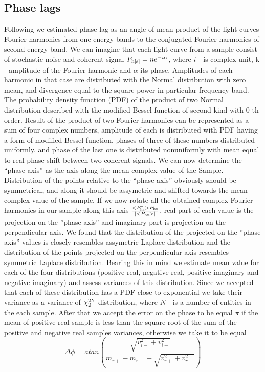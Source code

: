 \documentclass[a4paper,fleqn,usenatbib]{mnras}
\begin{document}
\subsection{Phase lags}
    
Following \citep{1997ApJ...474L..43V} we estimated phase lag as an angle of mean product of the light curves Fourier harmonics from one energy bands to the conjugated Fourier harmonics of second energy band. 
We can imagine that each light curve from a sample consist of stochastic noise and coherent signal $F_{\rm h[s]} = ne^{-i\alpha}$, where $i$ - is complex unit, k - amplitude of the Fourier harmonic and $\alpha$ its phase.
Amplitudes of each harmonic in that case are distributed with the Normal distribution with zero mean, and divergence equal to the square power in particular frequency band. 
The probability density function (PDF) of the product of two Normal distribution described with the modified Bessel function of second kind with 0-th order. 
Result of the product of two Fourier harmonics can be represented as a sum of four complex numbers, amplitude of each is distributed with PDF having a form of modified Bessel function, phases of three of these numbers distributed uniformly, and phase of the last one is distributed nonuniformly with mean equal to real phase shift between two coherent signals.
We can now determine the ``phase axis'' as the axis along the mean complex value of the Sample.
Distribution of the points relative to the ``phase axis'' obviously should be symmetrical, and along it should be assymetric and shifted towards the mean complex value of the sample.
If we now rotate all the obtained complex Fourier harmonics in our sample along this axis $\frac{<P_{\rm hs}^{*}>P_{\rm hs}}{|<P_{\rm hs}>|}$, real part of each value is the projection on the ''phase axis'' and imaginary part is projection on the perpendicular axis. 
We found that the distribution of the projected on the ''phase axis'' values is closely resembles assymetric Laplace distribution and the distribution of the points projected on the perpendicular axis resembles symmetric Laplace distribution. 
Bearing this in mind we estimate mean value for each of the four distributions (positive real, negative real, positive imaginary and negative imaginary) and assess variances of this distribution.
Since we accepted that each of these distribution has a PDF close to exponential we take their variance as a variance of $\chi_2^{\rm 2N}$ distribution, where $N$ - is a number of entities in the each sample. 
After that we accept the error on the phase to be equal $\pi$ if the mean of positive real sample is less than the square root of the sum of the positive and negative real samples variances, otherwise we take it to be equal
\begin{equation}
        \Delta \phi = atan{\left(\frac{\sqrt{v_{i-}^2 + v_{i+}^{2}}}{m_{r+} - m_{r-} - \sqrt{v_{r+}^2 + v_{r-}^2}}\right)}
\end{equation}
\end{document}
